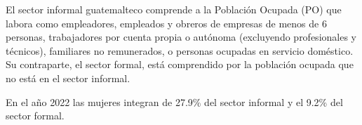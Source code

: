 El sector informal guatemalteco comprende a la Población Ocupada (PO) que labora como empleadores, empleados y obreros de empresas de menos de 6 personas, trabajadores por cuenta propia o autónoma (excluyendo profesionales y técnicos), familiares no remunerados, o personas ocupadas en servicio doméstico. Su contraparte, el sector formal, está comprendido por la población ocupada que no está en el sector informal. 

En el año 2022 las mujeres integran de 27.9\% del sector informal y el 9.2\% del sector formal. 